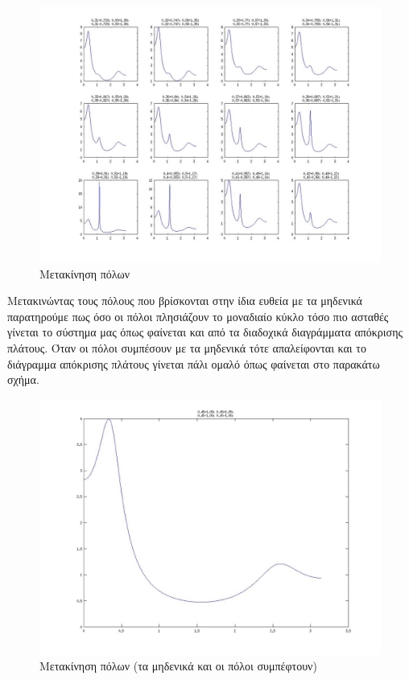 \documentclass[a4paper,10pt]{article} \usepackage{anysize}
\begin{document}
\begin{figure}[H]
\caption{Μετακίνηση πόλων}
\centering
	\includegraphics[scale=0.4]{files/26-metakinoumenoi_poloi.jpg}
\end{figure}
Μετακινώντας τους πόλους που βρίσκονται στην ίδια ευθεία με τα μηδενικά
παρατηρούμε πως όσο οι πόλοι πλησιάζουν το μοναδιαίο κύκλο τόσο πιο ασταθές
γίνεται το σύστημα μας όπως φαίνεται και από τα διαδοχικά διαγράμματα
απόκρισης πλάτους. Όταν οι πόλοι συμπέσουν με τα μηδενικά τότε απαλείφονται
και το διάγραμμα απόκρισης πλάτους γίνεται πάλι ομαλό όπως φαίνεται στο
παρακάτω σχήμα. 
\begin{figure}[H]
\caption{Μετακίνηση πόλων (τα μηδενικά και οι πόλοι συμπέφτουν)}
\centering
	\includegraphics[scale=0.4]{files/26-metakinoumenoi_poloi_last_frame.jpg}
\end{figure}
\end{document}
